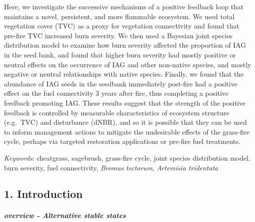 \documentclass[
  12pt,
]{article}
\begin{document}
Here, we investigate the successive mechanisms of a positive feedback
loop that maintains a novel, persistent, and more flammable ecosystem.
We used total vegetation cover (TVC) as a proxy for vegetation
connectivity and found that pre-fire TVC increased burn severity. We
then used a Bayesian joint species distribution model to examine how
burn severity affected the proportion of IAG in the seed bank, and found
that higher burn severity had mostly positive or neutral effects on the
occurrence of IAG and other non-native species, and mostly negative or
neutral relationships with native species. Finally, we found that the
abundance of IAG seeds in the seedbank immediately post-fire had a
positive effect on the fuel connectivity 3 years after fire, thus
completing a positive feedback promoting IAG. These results suggest that
the strength of the positive feedback is controlled by measurable
characteristics of ecosystem structure (e.g.~TVC) and disturbance
(dNBR), and so it is possible that they can be used to inform management
actions to mitigate the undesirable effects of the grass-fire cycle,
perhaps via targeted restoration applications or pre-fire fuel
treatments.

\emph{Keywords}: cheatgrass, sagebrush, grass-fire cycle, joint species
distribution model, burn severity, fuel connectivity, \emph{Bromus
tectorum}, \emph{Artemisia tridentata}

\hypertarget{introduction}{%
\subsection{1. Introduction}\label{introduction}}

\hypertarget{overview---alternative-stable-states}{%
\subparagraph{overview - Alternative stable
states}\label{overview---alternative-stable-states}}
\end{document}
